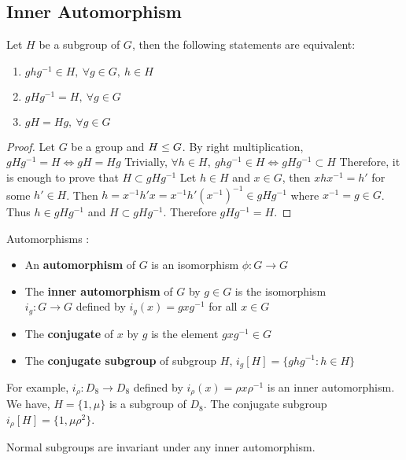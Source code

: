 \subsection{Inner Automorphism}
\begin{theorem}
	Let $H$ be a subgroup of $G$, then the following statements are equivalent:
	\begin{enumerate}
		\item $ghg^{-1} \in H,\ \forall g \in G,\ h \in H$
		\item $gHg^{-1} = H,\ \forall g \in G$
		\item $gH = Hg,\ \forall g \in G$
	\end{enumerate}
\end{theorem}
\begin{proof}
	Let $G$ be a group and $H \le G$.
	By right multiplication,  $gHg^{-1} = H \iff gH = Hg$
	Trivially, $\forall h \in H,\ ghg^{-1} \in H \iff gHg^{-1} \subset H$
	Therefore, it is enough to prove that $H \subset gHg^{-1}$
	Let $h \in H$ and $x \in G$, then $xhx^{-1} = h'$ for some $h' \in H$.
	Then $h = x^{-1}h'x = x^{-1}h'(x^{-1})^{-1} \in gHg^{-1}$ where $x^{-1} = g \in G$.
	Thus $h \in gHg^{-1}$ and $H \subset gHg^{-1}$.
	Therefore $gHg^{-1} = H$.
\end{proof}

\begin{definition}Automorphisms : 
	\begin{itemize}
		\item An \textbf{automorphism} of $G$ is an isomorphism $\phi : G \to G$
		\item The \textbf{inner automorphism} of $G$ by $g \in G$ is the isomorphism\\
			$i_g : G \to G$ defined by $i_g(x) = gxg^{-1}$ for all $x \in G$
		\item The \textbf{conjugate} of $x$ by $g$ is the element $gxg^{-1} \in G$
		\item The \textbf{conjugate subgroup} of subgroup $H$, $i_g[H] = \{ ghg^{-1} : h \in H \}$
	\end{itemize}
\end{definition}

\begin{remark}
	For example, $i_\rho : D_8 \to D_8$ defined by $i_\rho(x) = \rho x \rho^{-1}$ is an inner automorphism.
	We have, $H = \{ 1,\mu \}$ is a subgroup of $D_8$.
	The conjugate subgroup $i_\rho[H] = \{ 1,\mu\rho^2 \}$.
\end{remark}

\begin{remark}
	Normal subgroups are invariant under any inner automorphism.
\end{remark}

